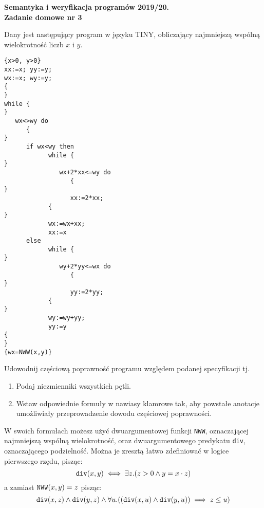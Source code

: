\documentclass[final,12pt]{article}
\begin{document}
\lstset{language=whileprograms} 

\begin{center}
{\bf Semantyka i weryfikacja programów 2019/20.\\
     Zadanie domowe nr 3 }

\end{center}
Dany jest następujący program w języku TINY, obliczający 
najmniejszą wspólną wielokrotność liczb $x$ i $y$.
\begin{lstlisting}
{x>0, y>0}
xx:=x; yy:=y;
wx:=x; wy:=y;
{                                                                                      }
while {                                                                                }
   wx<>wy do
      {                                                                                }
      if wx<wy then
            while {                                                                    }
               wx+2*xx<=wy do
                  {                                                                    }
                  xx:=2*xx;
            {                                                                          }
            wx:=wx+xx;
            xx:=x
      else
            while {                                                                    }
               wy+2*yy<=wx do
                  {                                                                    }
                  yy:=2*yy;
            {                                                                          }
            wy:=wy+yy;
            yy:=y
{                                                                                      }
{wx=NWW(x,y)}
\end{lstlisting}
Udowodnij częściową poprawność programu względem podanej
specyfikacji
tj.
\begin{enumerate}
\item Podaj niezmienniki wszystkich pętli.
\item Wstaw odpowiednie formuły w nawiasy klamrowe tak, aby powstałe anotacje umożliwiały przeprowadzenie dowodu częściowej poprawności.
\end{enumerate}

W swoich formułach możesz użyć dwuargumentowej funkcji {\tt NWW}, oznaczającej najmniejszą wspólną wielokrotność, oraz dwuargumentowego predykatu {\tt div}, oznaczającego podzielność. Można je zresztą łatwo zdefiniować w logice pierwszego rzędu, pisząc:
\[
	{\tt div}(x,y) \iff \exists z. (z>0\land y=x\cdot z)
\]
a zamiast ${\tt NWW}(x,y)=z$ pisząc:
\[
	{\tt div}(x,z) \land {\tt div}(y,z) \land \forall u.(({\tt div}(x,u) \land {\tt div}(y,u)) \implies z\leq u)
\]
\end{document}
